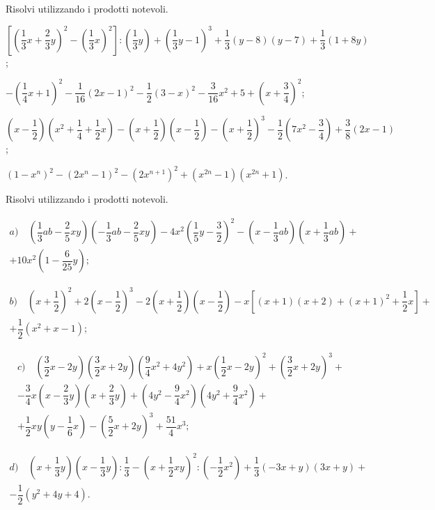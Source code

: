 \begin{esercizio}[\Ast]
 \label{ese:12.42}
Risolvi utilizzando i prodotti notevoli.
 \begin{enumeratea}
 \item $\left[\left(\dfrac{1}{3}x+\dfrac{2}{3}y\right)^{2}-\left(\dfrac{1}{3}x\right)^{2}\right]:\left(\dfrac{1}{3}y\right)+\left(\dfrac{1}{3}y-1\right)^{3}+\dfrac{1}{3}(y-8)(y-7)+\dfrac{1}{3}(1+8y)$;
 \item $-\left(\dfrac{1}{4}x+1\right)^{2}-\dfrac{1}{16}(2x-1)^{2}-\dfrac{1}{2}(3-x)^{2}-\dfrac{3}{16}x^{2}+5+\left(x+\dfrac{3}{4}\right)^{2}$;
 \item $\left(x-\dfrac{1}{2}\right)\left(x^{2}+\dfrac{1}{4}+\dfrac{1}{2}x\right)-\left(x+\dfrac{1}{2}\right)\left(x-\dfrac{1}{2}\right)-\left(x+\dfrac{1}{2}\right)^{3}-\dfrac{1}{2}\left(7x^{2}-\dfrac{3}{4}\right)+\dfrac{3}{8}(2x-1)$;
 \item $\left(1-x^{n}\right)^{2}-\left(2x^{n}-1\right)^{2}-\left(2x^{n+1}\right)^{2}+\left(x^{2n}-1\right)\left(x^{2n}+1\right)$.
 \end{enumeratea}
\end{esercizio}

\begin{esercizio}[\Ast]
 \label{ese:12.43}
Risolvi utilizzando i prodotti notevoli.

 \begin{multline*}
a)\quad \left(\dfrac{1}{3}{ab}-\dfrac{2}{5}{xy}\right)\left(-{\dfrac{1}{3}}{ab}-\dfrac{2}{5}{xy}\right)-4x^{2}\left(\dfrac{1}{5}y-\dfrac{3}{2}\right)^{2}-\left(x-\dfrac{1}{3}{ab}\right)\left(x+\dfrac{1}{3}{ab}\right)+\\
 +10x^{2}\left(1-\dfrac{6}{25}y\right);
 \end{multline*}

\begin{multline*}
b)\quad \left(x+\dfrac{1}{2}\right)^{2}+2\left(x-\dfrac{1}{2}\right)^{3}-2\left(x+\dfrac{1}{2}\right)\left(x-\dfrac{1}{2}\right)-x\left[(x+1)(x+2)+(x+1)^{2}+\dfrac{1}{2}x\right]+\\
+\dfrac{1}{2}\left(x^{2}+x-1\right);
\end{multline*} 

\begin{multline*}
c)\quad \left(\dfrac{3}{2}x-2y\right)\left(\dfrac{3}{2}x+2y\right)\left(\dfrac{9}{4}x^{2}+4y^{2}\right)+x\left(\dfrac{1}{2}x-2y\right)^{2}+\left(\dfrac{3}{2}x+2y\right)^{3}+\\
-\dfrac{3}{4}x\left(x-\dfrac{2}{3}y\right)\left(x+\dfrac{2}{3}y\right)+\left(4y^{2}-\dfrac{9}{4}x^{2}\right)\left(4y^{2}+\dfrac{9}{4}x^{2}\right)+\\
+\dfrac{1}{2}{xy}\left(y-\dfrac{1}{6}x\right)-\left(\dfrac{5}{2}x+2y\right)^{3}+\dfrac{51}{4}x^{3};
\end{multline*} 

\begin{multline*}
d)\quad \left(x+\dfrac{1}{3}y\right)\left(x-\dfrac{1}{3}y\right):\dfrac{1}{3}-\left(x+\dfrac{1}{2}{xy}\right)^{2}:\left(-{\dfrac{1}{2}}x^2\right)+\dfrac{1}{3}(-3x+y)(3x+y)+\\
 -\dfrac{1}{2}\left(y^{2}+4y+4\right).
\end{multline*}
\end{esercizio}

